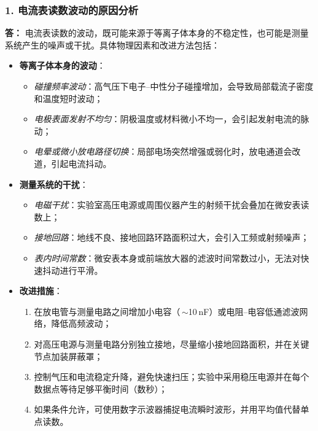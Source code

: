 \documentclass[12pt,a4paper,UTF8]{ctexart}
\begin{document}
\subsubsection*{1. 电流表读数波动的原因分析}
\textbf{答：}  
电流表读数的波动，既可能来源于等离子体本身的不稳定性，也可能是测量系统产生的噪声或干扰。具体物理因素和改进方法包括：  
\begin{itemize}
  \item \textbf{等离子体本身的波动}：  
  \begin{itemize}
    \item \emph{碰撞频率波动}：高气压下电子–中性分子碰撞增加，会导致局部载流子密度和温度短时波动；  
    \item \emph{电极表面发射不均匀}：阴极温度或材料微小不均一，会引起发射电流的脉动；  
    \item \emph{电晕或微小放电路径切换}：局部电场突然增强或弱化时，放电通道会改道，引起电流抖动。
  \end{itemize}
  \item \textbf{测量系统的干扰}：  
  \begin{itemize}
    \item \emph{电磁干扰}：实验室高压电源或周围仪器产生的射频干扰会叠加在微安表读数上；  
    \item \emph{接地回路}：地线不良、接地回路环路面积过大，会引入工频或射频噪声；  
    \item \emph{表内时间常数}：微安表本身或前端放大器的滤波时间常数过小，无法对快速抖动进行平滑。
  \end{itemize}
  \item \textbf{改进措施}：  
  \begin{enumerate}
    \item 在放电管与测量电路之间增加小电容（\,$\sim$10 nF）或电阻–电容低通滤波网络，降低高频波动；  
    \item 对高压电源与测量电路分别独立接地，尽量缩小接地回路面积，并在关键节点加装屏蔽罩；  
    \item 控制气压和电流稳定升降，避免快速扫压；实验中采用稳压电源并在每个数据点等待足够平衡时间（数秒）；  
    \item 如果条件允许，可使用数字示波器捕捉电流瞬时波形，并用平均值代替单点读数。
  \end{enumerate}
\end{itemize}
\end{document}
